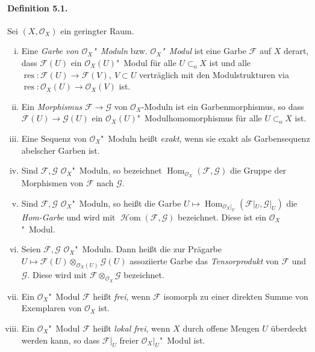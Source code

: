 \documentclass[11pt,b5paper,openany]{memoir}
\begin{document}
\paragraph{Definition 5.1.}\label{5.1} Sei $(X,\mathcal{O}_X)$ ein geringter Raum.
\begin{enumerate}[(i)]
\item Eine \textit{Garbe von $\mathcal{O}_X$"~Moduln} bzw. \textit{$\mathcal{O}_X$"~Modul} ist eine Garbe $\mathcal{F}$ auf $X$ derart, dass $\mathcal{F}(U)$ ein $\mathcal{O}_X(U)$"~Modul für alle $U\subset_\text{o}X$ ist und alle $\operatorname{res}:\mathcal{F}(U)\to\mathcal{F}(V),\ V\subset U$ verträglich mit den Modulstrukturen via $\operatorname{res}:\mathcal{O}_X(U)\to\mathcal{O}_X(V)$ ist.
\item Ein \textit{Morphismus} $\mathcal{F}\to\mathcal{G}$ von $\mathcal{O}_X$-Moduln ist ein Garbenmorphismus, so dass $\mathcal{F}(U)\to\mathcal{G}(U)$ ein $\mathcal{O}_X(U)$"~Modulhomomorphismus für alle $U\subset_\text{o}X$ ist.
\item Eine Sequenz von $\mathcal{O}_X$"~Moduln heißt \textit{exakt}, wenn sie exakt als Garbensequenz abelscher Garben ist.
\item Sind $\mathcal{F},\mathcal{G}$ $\mathcal{O}_X$"~Moduln, so bezeichnet $\operatorname{Hom}_{\mathcal{O}_X}(\mathcal{F},\mathcal{G})$ die Gruppe der Morphismen von $\mathcal{F}$ nach $\mathcal{G}$.
\item Sind $\mathcal{F},\mathcal{G}$ $\mathcal{O}_X$"~Moduln, so heißt die Garbe $U\mapsto \operatorname{Hom}_{\mathcal{O}_X|_U}(\mathcal{F}|_U,\mathcal{G}|_U)$ die \textit{Hom-Garbe} und wird mit $\operatorname{\mathcal{H}om}(\mathcal{F},\mathcal{G})$ bezeichnet. Diese ist ein $\mathcal{O}_X$"~Modul.
\item Seien $\mathcal{F},\mathcal{G}$ $\mathcal{O}_X$"~Moduln. Dann heißt die zur Prägarbe $U\mapsto\mathcal{F}(U)\otimes_{\mathcal{O}_X(U)}\mathcal{G}(U)$ assoziierte Garbe das \textit{Tensorprodukt} von $\mathcal{F}$ und $\mathcal{G}$. Diese wird  mit $\mathcal{F}\otimes_{\mathcal{O}_X}\mathcal{G}$ bezeichnet.
\item Ein $\mathcal{O}_X$"~Modul $\mathcal{F}$ heißt \textit{frei}, wenn $\mathcal{F}$ isomorph zu einer direkten Summe von Exemplaren von $\mathcal{O}_X$ ist.
\item Ein $\mathcal{O}_X$"~Modul $\mathcal{F}$ heißt \textit{lokal frei}, wenn $X$ durch offene Mengen $U$ überdeckt werden kann, so dass $\mathcal{F}|_U$ freier $\mathcal{O}_X|_U$"~Modul ist.


\end{enumerate}
\end{document}
